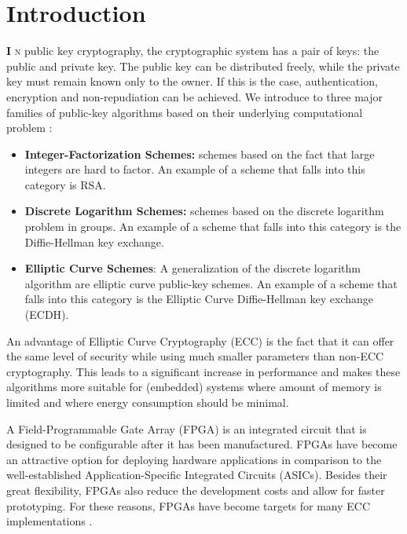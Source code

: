 \chapter{Introduction}
\lettrine[lhang = 0.4, findent=-30pt, lines=4]{\textbf{
		\initfamily \fontsize{20mm}{20mm} \selectfont I
		\normalfont}}{n}
public key cryptography, the cryptographic system has a pair of keys: the public and private key.
The public key can be distributed freely, while the private key must remain known only to the owner.
If this is the case, authentication, encryption and non-repudiation can be achieved.
We introduce to three major families of public-key algorithms based on their underlying computational problem \cite{paar2009understanding}:
%
\begin{itemize}
	\item \textbf{Integer-Factorization Schemes:} schemes based on the fact that large integers are hard to factor. An example of a scheme that falls into this category is RSA.
	
	\item  \textbf{Discrete Logarithm Schemes:} schemes based on the discrete logarithm problem in groups. An example of a scheme that falls into this category is the Diffie-Hellman key exchange.
	 
	\item \textbf{Elliptic Curve Schemes}: A generalization of the discrete logarithm algorithm are elliptic curve public-key schemes. An example of a scheme that falls into this category is the Elliptic Curve Diffie-Hellman key exchange (ECDH).
\end{itemize}
%
An advantage of Elliptic Curve Cryptography (ECC) is the fact that it can offer the same level of security while using much smaller parameters than non-ECC cryptography.
This leads to a significant increase in performance and makes these algorithms more suitable for (embedded) systems where amount of memory is limited and where energy consumption should be minimal.

A Field-Programmable Gate Array (FPGA) is an integrated circuit that is designed to be configurable after it has been manufactured.
FPGAs have become an attractive option for deploying hardware applications in comparison to the well-established Application-Specific Integrated Circuits (ASICs).
Besides their great flexibility, FPGAs also reduce the development costs and allow for faster prototyping.
For these reasons, FPGAs have become targets for many ECC implementations \cite{guneysu2008ultra, sasdrich2014efficient, sasdrich2015implementing}.

